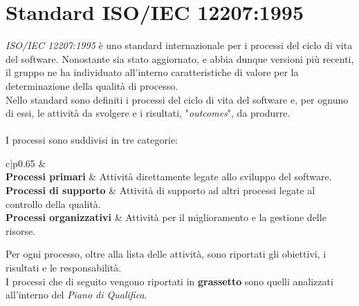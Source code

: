 \section{Standard ISO/IEC 12207:1995}
\textit{ISO/IEC 12207:1995} è uno standard
internazionale per i processi del ciclo di vita del software.
Nonostante sia stato aggiornato, e abbia dunque versioni più recenti, il gruppo
ne ha individuato all'interno caratteristiche di valore per la determinazione
della qualità di processo.\\
\noindent
Nello standard sono definiti i processi del ciclo di vita del
software e, per ognuno di essi, le attività da svolgere e i
risultati, "\textit{outcomes}", da produrre.\\ \\
\noindent
I processi sono suddivisi in tre categorie:

\setlength\extrarowheight{5pt}

\begin{table}[h!]
    \centering
    \begin{tabular}{c|p{0.65\linewidth}}
        &  \\[4pt]
	    	\textbf{Processi primari} & Attività direttamente legate allo sviluppo del software. \\[4pt]
	    	\textbf{Processi di supporto} & Attività di supporto ad altri processi legate al controllo della qualità. \\[4pt]
	    	\textbf{Processi organizzativi} & Attività per il miglioramento e la gestione delle risorse.\\[4pt]
    \end{tabular}
    \caption{Categorie di processo}
\end{table}

\noindent
Per ogni processo, oltre alla lista delle attività, sono riportati
gli obiettivi, i risultati e le responsabilità.\\
I processi che di seguito vengono riportati in \textbf{grassetto} sono quelli analizzati all'interno
del \textit{Piano di Qualifica}.


